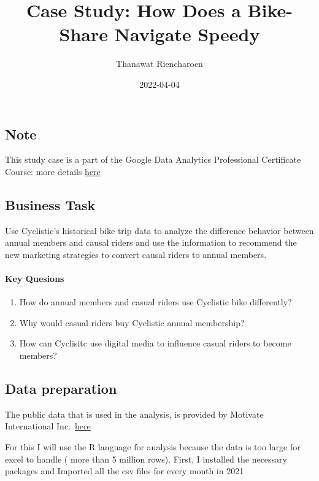 \documentclass[
]{article}
\title{Case Study: How Does a Bike-Share Navigate Speedy}
\author{Thanawat Riencharoen}
\date{2022-04-04}
\providecommand{\tightlist}{%
  \setlength{\itemsep}{0pt}\setlength{\parskip}{0pt}}
\begin{document}
\maketitle

\hypertarget{note}{%
\subsection{Note}\label{note}}

This study case is a part of the Google Data Analytics Professional
Certificate Course: more details
\href{https://www.coursera.org/professional-certificates/google-data-analytics}{here}

\hypertarget{business-task}{%
\subsection{Business Task}\label{business-task}}

Use Cyclistic's historical bike trip data to analyze the difference
behavior between annual members and causal riders and use the
information to recommend the new marketing strategies to convert causal
riders to annual members.

\hypertarget{key-quesions}{%
\paragraph{Key Quesions}\label{key-quesions}}

\begin{enumerate}
\def\labelenumi{\arabic{enumi}.}
\tightlist
\item
  How do annual members and casual riders use Cyclistic bike
  differently?
\item
  Why would casual riders buy Cyclistic annual membership?
\item
  How can Cyclisitc use digital media to influence casual riders to
  become members?
\end{enumerate}

\hypertarget{data-preparation}{%
\subsection{Data preparation}\label{data-preparation}}

The public data that is used in the analysis, is provided by Motivate
International
Inc.~\href{https://www.kaggle.com/datasets/arashnic/fitbit}{here}

For this I will use the R language for analysis because the data is too
large for excel to handle ( more than 5 million rows). First, I
installed the necessary packages and Imported all the csv files for
every month in 2021
\end{document}
